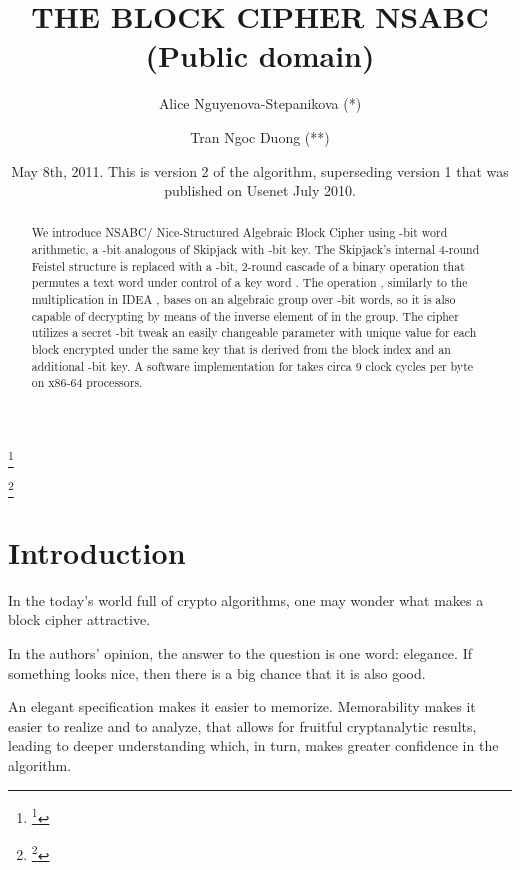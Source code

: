 \documentclass[a4paper,oneside,english]{amsart}
\numberwithin{equation}{section}
\numberwithin{figure}{section}
\begin{document}
\title{THE BLOCK CIPHER NSABC (Public domain)}


\author{Alice Nguyenova-Stepanikova ({*})}


\thanks{\thanks{({*}) Hradcany, Praha, Czech Republic}}


\author{Tran Ngoc Duong ({*}{*})}


\thanks{\thanks{({*}{*}) Pernink, Karlovy Vary, Czech Republic. E-mail: \texttt{tranngocduong@gmail.com}}}


\date{May 8th, 2011. This is version 2 of the algorithm, superseding version
1 that was published on Usenet July 2010.}
\begin{abstract}
We introduce NSABC/ \textendash{} Nice-Structured Algebraic Block
Cipher using -bit word arithmetic, a -bit analogous of Skipjack
\cite{NSA98} with -bit key. The Skipjack's internal 4-round
Feistel structure is replaced with a -bit, 2-round cascade of
a binary operation  that permutes
a text word  under control of a key word . The operation ,
similarly to the multiplication in IDEA \cite{LM91,LMM91}, bases
on an algebraic group over -bit words, so it is also capable of
decrypting by means of the inverse element of  in the group. The
cipher utilizes a secret -bit tweak \textendash{} an easily changeable
parameter with unique value for each block encrypted under the same
key \cite{LRW02} \textendash{} that is derived from the block index
and an additional -bit key. A software implementation for 
takes circa 9 clock cycles per byte on x86-64 processors.
\end{abstract}


\maketitle

\section{Introduction}

In the today's world full of crypto algorithms, one may wonder what
makes a block cipher attractive.

In the authors' opinion, the answer to the question is one word: elegance.
If something looks nice, then there is a big chance that it is also
good.

An elegant specification makes it easier to memorize. Memorability
makes it easier to realize and to analyze, that allows for fruitful
cryptanalytic results, leading to deeper understanding which, in turn,
makes greater confidence in the algorithm.
\end{document}
